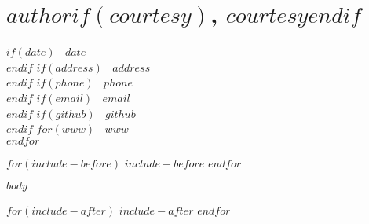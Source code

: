 \documentclass[$if(fontsize)$$fontsize$,$endif$$if(lang)$$lang$,$endif$$if(papersize)$$papersize$,$endif$$for(classoption)$$classoption$$sep$,$endfor$]{$documentclass$}
\begin{document}
\thispagestyle{empty}

\section{$author$$if(courtesy)$, $courtesy$$endif$}\label{author}

$if(date)$
\textcolor{sectiongray}{\faCalendar} \(~\) $date$\\
$endif$
$if(address)$
\textcolor{sectiongray}{\faMap} \(~\) $address$\\
$endif$
$if(phone)$
\textcolor{sectiongray}{\faPhone} \(~\) $phone$\\
$endif$
$if(email)$
\textcolor{sectiongray}{\faEnvelope} \(~\) $email$\\
$endif$
$if(github)$
\textcolor{sectiongray}{\faGithub} \(~\) $github$\\
$endif$
$for(www)$
\textcolor{sectiongray}{\faGlobe} \(~\) $www$\\
$endfor$

$for(include-before)$
$include-before$
$endfor$

$body$

$for(include-after)$
$include-after$
$endfor$
\end{document}
